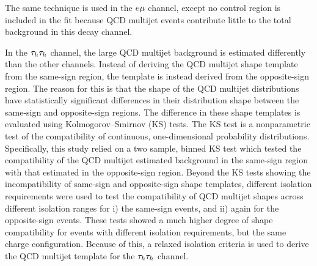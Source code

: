 The same technique is used in the $e\mu$ channel, except no control region is included in the 
fit because QCD multijet events contribute little to the total background in this decay channel.


In the $\tau_{h}\tau_{h}$ channel, the large QCD multijet background is estimated differently than
the other channels. Instead of deriving the QCD multijet shape template from the same-sign
region, the template is instead derived from the opposite-sign region. 
The reason for this is that the shape of the QCD multijet
distributions have statistically significant differences in their distribution shape 
between the same-sign and opposite-sign regions. The difference in these shape templates is
evaluated using Kolmogorov--Smirnov (KS) tests. The KS test is a nonparametric test of the compatibility
of continuous, one-dimensional probability distributions. Specifically, this study relied
on a two sample, binned KS test which tested the compatibility of the QCD multijet
estimated background in the same-sign region with that estimated in the opposite-sign region.
Beyond the KS tests showing the incompatibility of same-sign and opposite-sign shape templates, different
isolation requirements were used to test the compatibility of QCD multijet shapes
across different isolation ranges for i) the same-sign events, and ii) again for the
opposite-sign events. These tests showed a much higher degree of shape compatibility
for events with different isolation requirements, but the same charge configuration.
Because of this, a relaxed isolation criteria is used to derive the QCD multijet
template for the $\tau_{h}\tau_{h}$ channel.

